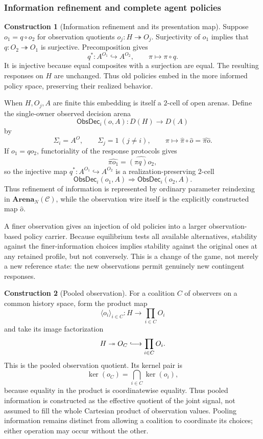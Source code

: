 \documentclass[11pt,a4paper]{article}
\numberwithin{equation}{section}
\theoremstyle{definition}
\newtheorem{construction}[construction]{Construction}
\theoremstyle{remark}
\theoremstyle{plain}
\begin{document}
\subsubsection{Information refinement and complete agent policies}

\begin{construction}[Information refinement and its presentation map]
Suppose $o_1=q\circ o_2$ for observation quotients
$o_j:H\twoheadrightarrow O_j$. Surjectivity of $o_1$ implies that
$q:O_2\twoheadrightarrow O_1$ is surjective. Precomposition gives
\[
 q^*:A^{O_1}\hookrightarrow A^{O_2},\qquad
 \pi\longmapsto\pi\circ q.
\]
It is injective because equal composites with a surjection are equal. The
resulting responses on $H$ are unchanged. Thus old policies embed in the more
informed policy space, preserving their realized behavior.

When $H,O_j,A$ are finite this embedding is itself a $2$-cell of open arenas. Define the single-owner observed decision arena
\[
 \mathsf{ObsDec}_i(o,A):D(H)\longrightarrow D(A)
\]
by
\[
 \Sigma_i=A^O,
 \qquad
 \Sigma_j=1\ (j\ne i),
 \qquad
 \pi\longmapsto\widehat\pi\circ\widehat o
             =\widehat{\pi o}.
\]
If $o_1=qo_2$, functoriality of the response protocols gives
\[
 \widehat{\pi o_1}
 =\widehat{(\pi q)o_2},
\]
so the injective map $q^*:A^{O_1}\hookrightarrow A^{O_2}$ is a
realization-preserving $2$-cell
\[
 \mathsf{ObsDec}_i(o_1,A)
 \Longrightarrow
 \mathsf{ObsDec}_i(o_2,A).
\]
Thus refinement of information is represented by ordinary parameter
reindexing in $\mathbf{Arena}_N(\mathcal C)$, while the observation wire itself
is the explicitly constructed map $\widehat o$.
\end{construction}

A finer observation gives an injection of old policies into a
larger observation-based policy carrier. Because equilibrium tests all
available alternatives, stability against the finer-information choices
implies stability against the original ones at any retained profile, but
not conversely. This is a change of the game, not merely a new reference
state: the new observations permit genuinely new contingent responses.

\begin{construction}[Pooled observation]
\label{con:egt-pooled-observation}
For a coalition $C$ of observers on a common history space, form the product
map
\[
 \langle o_i\rangle_{i\in C}:H\longrightarrow\prod_{i\in C}O_i
\]
and take its image factorization
\[
 H\twoheadrightarrow O_C\lhook\joinrel\longrightarrow
 \prod_{i\in C}O_i.
\]
This is the pooled observation quotient. Its kernel pair is
\[
 \ker(o_C)=\bigcap_{i\in C}\ker(o_i),
\]
because equality in the product is coordinatewise equality. Thus pooled
information is constructed as the effective quotient of the joint signal,
not assumed to fill the whole Cartesian product of observation values.
Pooling information remains distinct from allowing a coalition to coordinate
its choices; either operation may occur without the other.
\end{construction}
\end{document}
